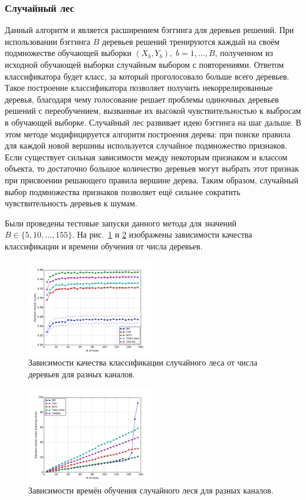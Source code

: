 
\subsubsection{Случайный лес}
Данный алгоритм и является расширением бэггинга для деревьев решений. При использовании бэггинга \(B\) деревьев решений тренируются каждый на своём подмножестве обучающей выборки \(\left(X_b, Y_b\right),\;b=1,\dotsc,B\), полученном из исходной обучающей выборки случайным выбором с повторениями. Ответом классификатора будет класс, за который проголосовало больше всего деревьев. Такое построение классификатора позволяет получить некоррелированные деревья, благодаря чему голосование решает проблемы одиночных деревьев решений с переобучением, вызванные их высокой чувствительностью к выбросам в обучающей выборке. Случайный лес развивает идею бэггинга на шаг дальше. В этом методе модифицируется алгоритм построения дерева: при поиске правила для каждой новой вершины используется случайное подмножество признаков. Если существует сильная зависимости между некоторым признаком и классом объекта, то достаточно большое количество деревьев могут выбрать этот признак при присвоении решающего правила вершине дерева. Таким образом, случайный выбор подмножества признаков позволяет ещё сильнее сократить чувствительность деревьев к шумам.

Были проведены тестовые запуски данного метода для значений \(B\in\{5,10,\dotsc,155\}\). На рис.~\ref{fig:randfor-base-scores} и \ref{fig:randfor-base-times} изображены зависимости качества классификации и времени обучения от числа деревьев.
\begin{figure}[h!]
    \centering
    \includegraphics[width=0.5\textwidth]{images/randfor-scores.png}
    \caption{Зависимости качества классификации случайного леса от числа деревьев для разных каналов.}
    \label{fig:randfor-base-scores}
\end{figure}
\begin{figure}[h!]
    \centering
    \includegraphics[width=0.5\textwidth]{images/randfor-times.png}
    \caption{Зависимости времён обучения случайного леся для разных каналов.}
    \label{fig:randfor-base-times}
\end{figure}

